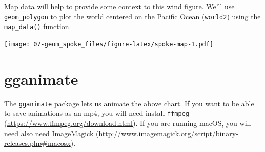 \documentclass[]{book}
\newenvironment{Shaded}{\begin{snugshade}}{\end{snugshade}}
\newcommand{\KeywordTok}[1]{\textcolor[rgb]{0.13,0.29,0.53}{\textbf{{#1}}}}
\newcommand{\DataTypeTok}[1]{\textcolor[rgb]{0.13,0.29,0.53}{{#1}}}
\newcommand{\DecValTok}[1]{\textcolor[rgb]{0.00,0.00,0.81}{{#1}}}
\newcommand{\StringTok}[1]{\textcolor[rgb]{0.31,0.60,0.02}{{#1}}}
\newcommand{\OtherTok}[1]{\textcolor[rgb]{0.56,0.35,0.01}{{#1}}}
\newcommand{\NormalTok}[1]{{#1}}
\theoremstyle{definition}
\theoremstyle{definition}
\theoremstyle{remark}
\begin{document}
Map data will help to provide some context to this wind figure. We'll
use \texttt{geom\_polygon} to plot the world centered on the Pacific
Ocean (\texttt{world2}) using the \texttt{map\_data()} function.

\begin{Shaded}
\end{Shaded}

\texttt{[image: 07-geom\_spoke\_files/figure-latex/spoke-map-1.pdf]}

\section{gganimate}\label{gganimate}

The \texttt{gganimate} package lets us animate the above chart. If you
want to be able to save animations as an mp4, you will need install
\texttt{ffmpeg} (\url{https://www.ffmpeg.org/download.html}). If you are
running macOS, you will need also need ImageMagick
(\url{http://www.imagemagick.org/script/binary-releases.php\#macosx}).
\end{document}
